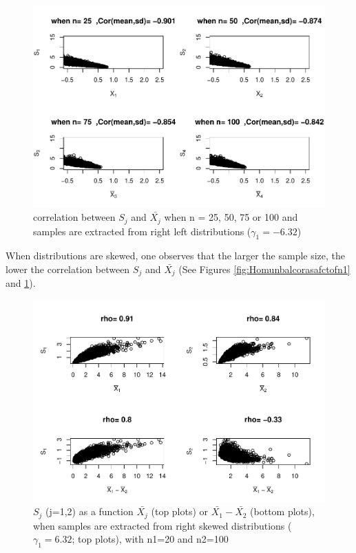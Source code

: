 \documentclass[
  man]{apa6}
\begin{document}
\begin{figure}
\centering
\includegraphics{Correlations-between-the-sample-means-difference-and-standardizers-of-all-estimators,-and-implications-on-biases-and-variances-of-all-estimators_files/figure-latex/Homunbalcorasafctofn2-1.pdf}
\caption{\label{fig:Homunbalcorasafctofn2}correlation between \(S_j\) and \(\bar{X_j}\) when n = 25, 50, 75 or 100 and samples are extracted from right left distributions (\(\gamma_1 = -6.32\))}
\end{figure}

When distributions are skewed, one observes that the larger the sample size, the lower the correlation between \(S_j\) and \(\bar{X_j}\) (See Figures \ref{fig:Homunbalcorasafctofn1} and \ref{fig:Homunbalcorasafctofn2}).

\begin{figure}
\centering
\includegraphics{Correlations-between-the-sample-means-difference-and-standardizers-of-all-estimators,-and-implications-on-biases-and-variances-of-all-estimators_files/figure-latex/pltSDHomunbalRskew-1.pdf}
\caption{\label{fig:pltSDHomunbalRskew}\(S_j\) (j=1,2) as a function \(\bar{X_j}\) (top plots) or \(\bar{X_1}-\bar{X_2}\) (bottom plots), when samples are extracted from right skewed distributions (\(\gamma_1 = 6.32\); top plots), with n1=20 and n2=100}
\end{figure}
\end{document}
